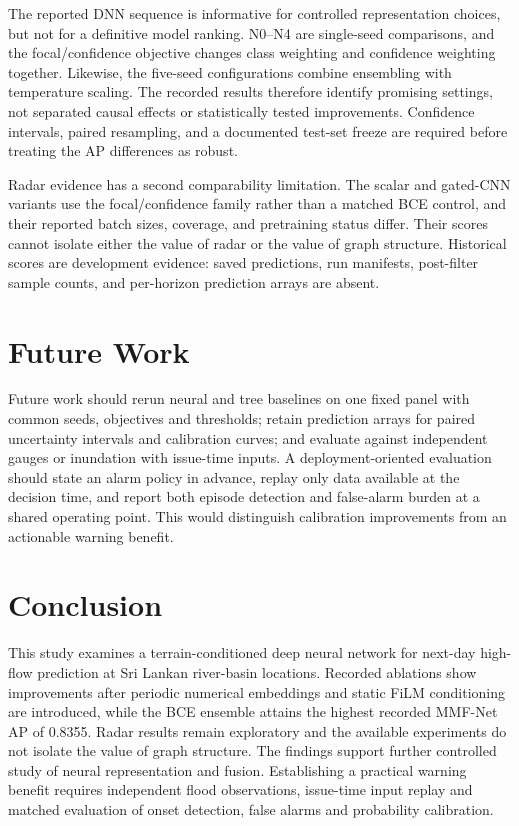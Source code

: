 \documentclass[conference]{IEEEtran}
\newcommand{\model}{MMF-Net}
\begin{document}
The reported DNN sequence is informative for controlled representation choices,
but not for a definitive model ranking. N0--N4 are single-seed comparisons, and
the focal/confidence objective changes class weighting and confidence weighting
together. Likewise, the five-seed configurations combine ensembling with
temperature scaling. The recorded results therefore identify promising settings,
not separated causal effects or statistically tested improvements. Confidence
intervals, paired resampling, and a documented test-set freeze are required
before treating the AP differences as robust.

Radar evidence has a second comparability limitation. The scalar and gated-CNN
variants use the focal/confidence family rather than a matched BCE control, and
their reported batch sizes, coverage, and pretraining status differ. Their
scores cannot isolate either the value of radar or the value of graph structure.
Historical scores are development evidence: saved predictions, run manifests,
post-filter sample counts, and per-horizon prediction arrays are absent.

\section{Future Work}
Future work should rerun neural and tree baselines on one fixed panel with
common seeds, objectives and thresholds; retain prediction arrays for paired
uncertainty intervals and calibration curves; and evaluate against independent
gauges or inundation with issue-time inputs. A deployment-oriented evaluation
should state an alarm policy in advance, replay only data available at the
decision time, and report both episode detection and false-alarm burden at a
shared operating point. This would distinguish calibration improvements from
an actionable warning benefit.

\section{Conclusion}
This study examines a terrain-conditioned deep neural network for next-day
high-flow prediction at Sri Lankan river-basin locations. Recorded ablations
show improvements after periodic numerical embeddings and static FiLM
conditioning are introduced, while the BCE ensemble attains the highest
recorded \model{} AP of 0.8355. Radar results remain exploratory and the
available experiments do not isolate the value of graph structure. The findings
support further controlled study of neural representation and fusion.
Establishing a practical warning benefit requires independent flood observations,
issue-time input replay and matched evaluation of onset detection, false alarms
and probability calibration.
\end{document}
